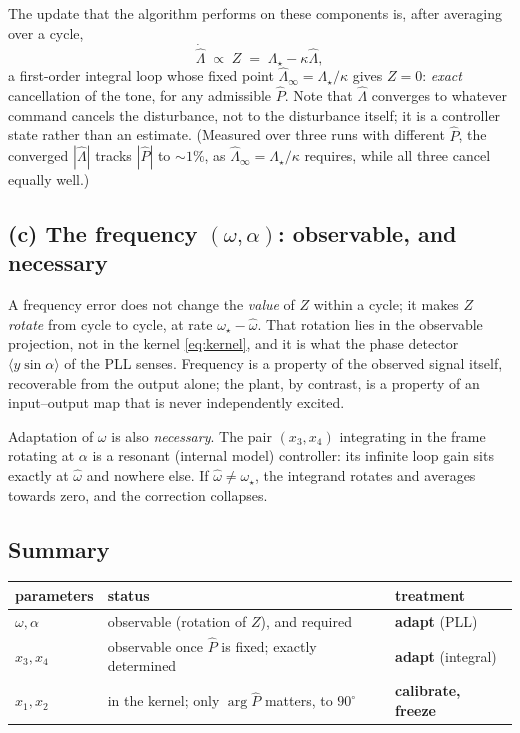 \documentclass[11pt]{article}
\begin{document}
The update that the algorithm performs on these components is,
after averaging over a cycle,
\begin{equation}
  \dot{\hat\Lambda}\;\propto\;Z\;=\;\Lambda_\star-\kappa\hat\Lambda,
\end{equation}
a first-order integral loop whose fixed point
$\hat\Lambda_\infty=\Lambda_\star/\kappa$ gives $Z=0$: \emph{exact}
cancellation of the tone, for any admissible $\hat P$. Note that
$\hat\Lambda$ converges to whatever command cancels the disturbance, not to
the disturbance itself; it is a controller state rather than an estimate.
(Measured over three runs with different $\hat P$, the converged
$|\hat\Lambda|$ tracks $|\hat P|$ to $\sim\!1\%$, as
$\hat\Lambda_\infty=\Lambda_\star/\kappa$ requires, while all three cancel
equally well.)

\subsection*{(c) The frequency $(\omega,\alpha)$: observable, and necessary}

A frequency error does not change the \emph{value} of $Z$ within a cycle;
it makes $Z$ \emph{rotate} from cycle to cycle, at rate
$\omega_\star-\hat\omega$. That rotation lies in the observable projection,
not in the kernel \eqref{eq:kernel}, and it is what the phase detector
$\langle y\sin\alpha\rangle$ of the PLL senses. Frequency is a property of
the observed signal itself, recoverable from the output alone; the plant,
by contrast, is a property of an input--output map that is never
independently excited.

Adaptation of $\omega$ is also \emph{necessary}. The pair $(x_3,x_4)$
integrating in the frame rotating at $\alpha$ is a resonant (internal
model) controller: its infinite loop gain sits exactly at $\hat\omega$ and
nowhere else. If $\hat\omega\neq\omega_\star$, the integrand rotates and
averages towards zero, and the correction collapses.

\subsection*{Summary}

\begin{center}
\begin{tabular}{lll}
  \toprule
  parameters & status & treatment\\
  \midrule
  $\omega,\alpha$ & observable (rotation of $Z$), and required & \textbf{adapt} (PLL)\\
  $x_3,x_4$       & observable once $\hat P$ is fixed; exactly determined & \textbf{adapt} (integral)\\
  $x_1,x_2$       & in the kernel; only $\arg\hat P$ matters, to $90^\circ$ & \textbf{calibrate, freeze}\\
  \bottomrule
\end{tabular}
\end{center}
\end{document}
